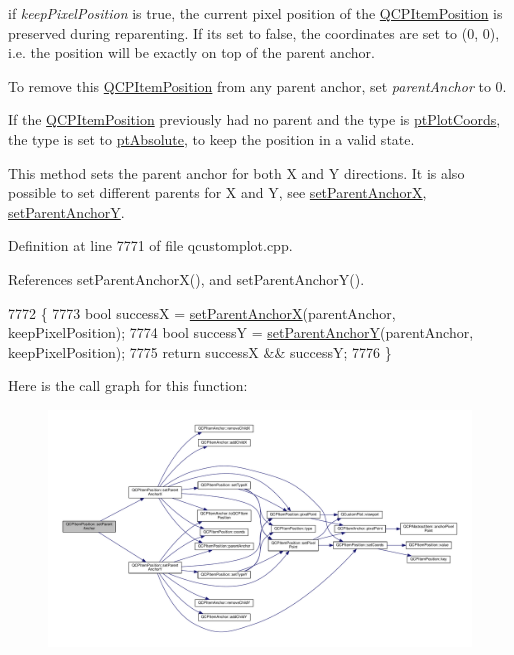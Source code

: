 if {\itshape keep\+Pixel\+Position} is true, the current pixel position of the \hyperlink{class_q_c_p_item_position}{Q\+C\+P\+Item\+Position} is preserved during reparenting. If it\textquotesingle{}s set to false, the coordinates are set to (0, 0), i.\+e. the position will be exactly on top of the parent anchor.

To remove this \hyperlink{class_q_c_p_item_position}{Q\+C\+P\+Item\+Position} from any parent anchor, set {\itshape parent\+Anchor} to 0.

If the \hyperlink{class_q_c_p_item_position}{Q\+C\+P\+Item\+Position} previously had no parent and the type is \hyperlink{class_q_c_p_item_position_aad9936c22bf43e3d358552f6e86dbdc8ad5ffb8dc99ad73263f7010c77342294c}{pt\+Plot\+Coords}, the type is set to \hyperlink{class_q_c_p_item_position_aad9936c22bf43e3d358552f6e86dbdc8a564f5e53e550ead1ec5fc7fc7d0b73e0}{pt\+Absolute}, to keep the position in a valid state.

This method sets the parent anchor for both X and Y directions. It is also possible to set different parents for X and Y, see \hyperlink{class_q_c_p_item_position_add71461a973927c74e42179480916d9c}{set\+Parent\+Anchor\+X}, \hyperlink{class_q_c_p_item_position_add5ec1db9d19cec58a3b5c9e0a0c3f9d}{set\+Parent\+Anchor\+Y}. 

Definition at line 7771 of file qcustomplot.\+cpp.



References set\+Parent\+Anchor\+X(), and set\+Parent\+Anchor\+Y().


\begin{DoxyCode}
7772 \{
7773   \textcolor{keywordtype}{bool} successX = \hyperlink{class_q_c_p_item_position_add71461a973927c74e42179480916d9c}{setParentAnchorX}(parentAnchor, keepPixelPosition);
7774   \textcolor{keywordtype}{bool} successY = \hyperlink{class_q_c_p_item_position_add5ec1db9d19cec58a3b5c9e0a0c3f9d}{setParentAnchorY}(parentAnchor, keepPixelPosition);
7775   \textcolor{keywordflow}{return} successX && successY;
7776 \}
\end{DoxyCode}


Here is the call graph for this function\+:\nopagebreak
\begin{figure}[H]
\begin{center}
\leavevmode
\includegraphics[width=350pt]{class_q_c_p_item_position_ac094d67a95d2dceafa0d50b9db3a7e51_cgraph}
\end{center}
\end{figure}


